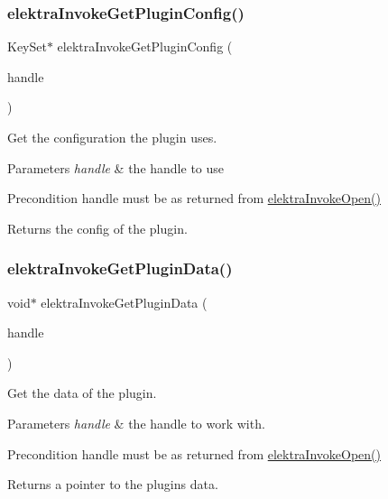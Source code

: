 \subsubsection{\texorpdfstring{elektra\+Invoke\+Get\+Plugin\+Config()}{elektraInvokeGetPluginConfig()}}
{\footnotesize\ttfamily Key\+Set$\ast$ elektra\+Invoke\+Get\+Plugin\+Config (\begin{DoxyParamCaption}\item[{Elektra\+Invoke\+Handle $\ast$}]{handle }\end{DoxyParamCaption})}



Get the configuration the plugin uses. 


\begin{DoxyParams}{Parameters}
{\em handle} & the handle to use\\
\hline
\end{DoxyParams}
\begin{DoxyPrecond}{Precondition}
handle must be as returned from \hyperlink{group__invoke_ga3fd9791ecf43c0dde08a2fc1f02db6bc}{elektra\+Invoke\+Open()}
\end{DoxyPrecond}
\begin{DoxyReturn}{Returns}
the config of the plugin. 
\end{DoxyReturn}
\mbox{\label{group__invoke_gac615e211a4d3c77addfa18152c274345}} 
\subsubsection{\texorpdfstring{elektra\+Invoke\+Get\+Plugin\+Data()}{elektraInvokeGetPluginData()}}
{\footnotesize\ttfamily void$\ast$ elektra\+Invoke\+Get\+Plugin\+Data (\begin{DoxyParamCaption}\item[{Elektra\+Invoke\+Handle $\ast$}]{handle }\end{DoxyParamCaption})}



Get the data of the plugin. 


\begin{DoxyParams}{Parameters}
{\em handle} & the handle to work with.\\
\hline
\end{DoxyParams}
\begin{DoxyPrecond}{Precondition}
handle must be as returned from \hyperlink{group__invoke_ga3fd9791ecf43c0dde08a2fc1f02db6bc}{elektra\+Invoke\+Open()}
\end{DoxyPrecond}
\begin{DoxyReturn}{Returns}
a pointer to the plugin\textquotesingle{}s data. 
\end{DoxyReturn}
\mbox{\label{group__invoke_ga13bd3afe428624d459239df73641d769}} 
